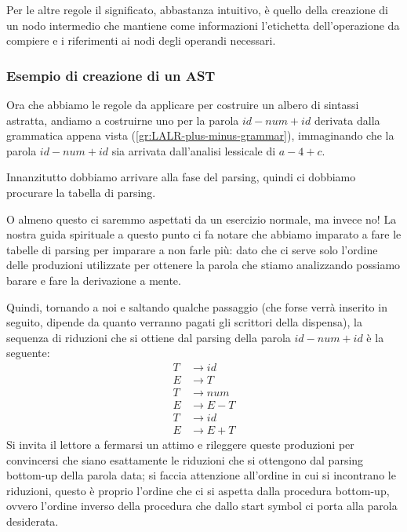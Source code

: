 \documentclass[class=book, crop=false, oneside, 12pt]{standalone}
\begin{document}
Per le altre regole il significato, abbastanza intuitivo, è quello della creazione di un nodo intermedio che mantiene come informazioni l'etichetta dell'operazione da compiere e i riferimenti ai nodi degli operandi necessari.

\subsubsection{Esempio di creazione di un AST}
Ora che abbiamo le regole da applicare per costruire un albero di sintassi astratta, andiamo a costruirne uno per la parola \(id-num+id\) derivata dalla grammatica appena vista (\ref{gr:LALR-plus-minus-grammar}), immaginando che la parola \(id-num+id\) sia arrivata dall'analisi lessicale di \(a-4+c\).

\noindent Innanzitutto dobbiamo arrivare alla fase del parsing, quindi ci dobbiamo procurare la tabella di parsing.

\noindent O almeno questo ci saremmo aspettati da un esercizio normale, ma invece no! La nostra guida spirituale a questo punto ci fa notare che abbiamo imparato a fare le tabelle di parsing per imparare a non farle più: dato che ci serve solo l'ordine delle produzioni utilizzate per ottenere la parola che stiamo analizzando possiamo barare e fare la derivazione a mente.

Quindi, tornando a noi e saltando qualche passaggio (che forse verrà inserito in seguito, dipende da quanto verranno pagati gli scrittori della dispensa), la sequenza di riduzioni che si ottiene dal parsing della parola \(id-num+id\) è la seguente:
\begin{align*}
    T &\to id \\
    E &\to T \\
    T &\to num \\
    E &\to E-T \\
    T &\to id \\
    E &\to E+T
\end{align*}
Si invita il lettore a fermarsi un attimo e rileggere queste produzioni per convincersi che siano esattamente le riduzioni che si ottengono dal parsing bottom-up della parola data; si faccia attenzione all'ordine in cui si incontrano le riduzioni, questo è proprio l'ordine che ci si aspetta dalla procedura bottom-up, ovvero l'ordine inverso della procedura che dallo start symbol ci porta alla parola desiderata.
\end{document}
